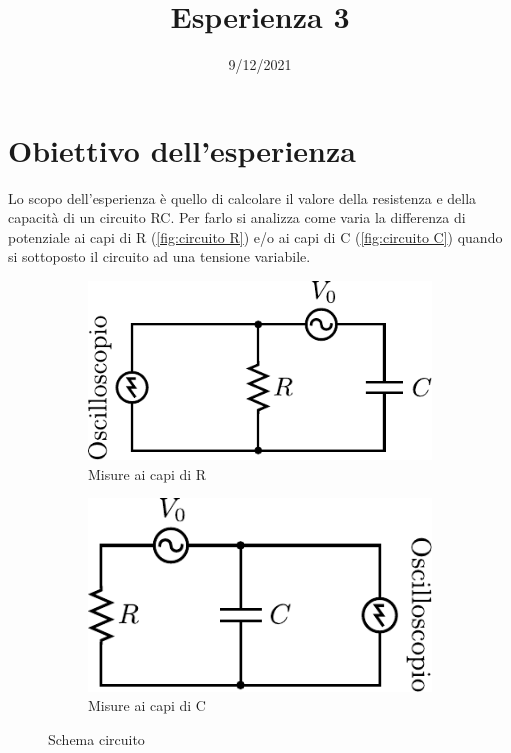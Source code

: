 \documentclass[11pt, a4paper]{article}
\title{Esperienza 3}
\date{9/12/2021}
\author{}
\numberwithin{equation}{section} %
\begin{document}
\maketitle

\thispagestyle{empty}

\tableofcontents

\section{Obiettivo dell'esperienza}

Lo scopo dell'esperienza è quello di calcolare il valore della resistenza e della capacità di un circuito RC. Per farlo si analizza come varia la differenza di potenziale ai capi di R (\autoref{fig:circuito R}) e/o ai capi di C (\autoref{fig:circuito C}) quando si sottoposto il circuito ad una tensione variabile.

\begin{figure}[ht!]
    \centering
    \begin{subfigure}[c]{.3\textwidth}
        \includegraphics[width=\textwidth]{circuito_osc_R.pdf}
        \caption{Misure ai capi di R}
        \label{fig:circuito R}
    \end{subfigure}
    \hspace{1in}
    \begin{subfigure}[c]{.3\textwidth}
        \includegraphics[width=\textwidth]{circuito_osc_C.pdf}
        \caption{Misure ai capi di C}
        \label{fig:circuito C}
    \end{subfigure}
    \caption{Schema circuito}
  \end{figure}
\end{document}
